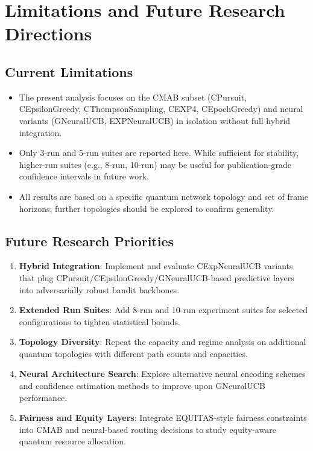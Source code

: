 \documentclass[12pt,a4paper]{article}
\begin{document}
\section{Limitations and Future Research Directions}

\subsection{Current Limitations}

\begin{itemize}
\item The present analysis focuses on the CMAB subset (CPursuit, CEpsilonGreedy, CThompsonSampling, CEXP4, CEpochGreedy) and neural variants (GNeuralUCB, EXPNeuralUCB) in isolation without full hybrid integration.
\item Only 3-run and 5-run suites are reported here. While sufficient for stability, higher-run suites (e.g., 8-run, 10-run) may be useful for publication-grade confidence intervals in future work.
\item All results are based on a specific quantum network topology and set of frame horizons; further topologies should be explored to confirm generality.
\end{itemize}

\subsection{Future Research Priorities}

\begin{enumerate}
\item \textbf{Hybrid Integration}: Implement and evaluate CExpNeuralUCB variants that plug CPursuit/CEpsilonGreedy/GNeuralUCB-based predictive layers into adversarially robust bandit backbones.
\item \textbf{Extended Run Suites}: Add 8-run and 10-run experiment suites for selected configurations to tighten statistical bounds.
\item \textbf{Topology Diversity}: Repeat the capacity and regime analysis on additional quantum topologies with different path counts and capacities.
\item \textbf{Neural Architecture Search}: Explore alternative neural encoding schemes and confidence estimation methods to improve upon GNeuralUCB performance.
\item \textbf{Fairness and Equity Layers}: Integrate EQUITAS-style fairness constraints into CMAB and neural-based routing decisions to study equity-aware quantum resource allocation.
\end{enumerate}
\end{document}
